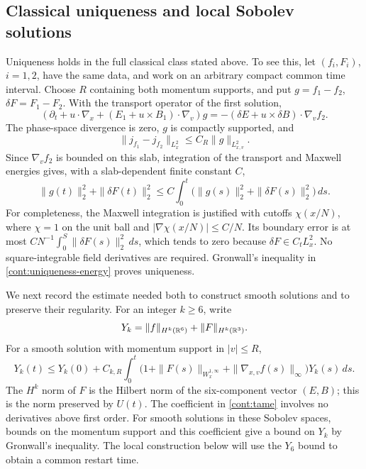 \subsection{Classical uniqueness and local Sobolev solutions}
\label{cont:local}

Uniqueness holds in the full classical class stated above.  To see this,
let $(f_i,F_i)$, $i=1,2$, have the same data, and work on an arbitrary
compact common time interval.  Choose $R$ containing both momentum
supports, and put $g=f_1-f_2$, $\delta F=F_1-F_2$.
With the transport operator of the first solution,
\[
 (\partial_t+u\cdot\nabla_x+(E_1+u\times B_1)\cdot\nabla_v)g
 =-(\delta E+u\times\delta B)\cdot\nabla_v f_2.
\]
The phase-space divergence is zero, $g$ is compactly supported, and
\[
 \|j_{f_1}-j_{f_2}\|_{L^2_x}\le C_R\|g\|_{L^2_{x,v}}.
\]
Since $\nabla_v f_2$ is bounded on this slab, integration of the transport
and Maxwell energies gives, with a slab-dependent finite constant $C$,
\begin{equation}\label{cont:uniqueness-energy}
 \|g(t)\|_2^2+\|\delta F(t)\|_2^2
 \le C\int_0^t\bigl(\|g(s)\|_2^2+\|\delta F(s)\|_2^2\bigr)\,ds.
\end{equation}
For completeness, the Maxwell integration is justified with cutoffs
$\chi(x/N)$, where $\chi=1$ on the unit ball and
$|\nabla\chi(x/N)|\le C/N$.  Its boundary error is at most
$C N^{-1}\int_0^S\|\delta F(s)\|_2^2\,ds$, which tends to zero because
$\delta F\in C_tL^2_x$.  No square-integrable field derivatives are
required.  Gronwall's inequality in \eqref{cont:uniqueness-energy}
proves uniqueness.

We next record the estimate needed both to construct smooth solutions
and to preserve their regularity.  For an integer $k\ge6$, write
\[
 Y_k=\|f\|_{H^k(\mathbb R^6)}+\|F\|_{H^k(\mathbb R^3)}.
\]
For a smooth solution with momentum support in $|v|\le R$,
\begin{equation}\label{cont:tame}
 Y_k(t)\le Y_k(0)+C_{k,R}\int_0^t
 \bigl(1+\|F(s)\|_{W^{1,\infty}_x}
          +\|\nabla_{x,v}f(s)\|_\infty\bigr)Y_k(s)\,ds.
\end{equation}
The $H^k$ norm of $F$ is the Hilbert norm of the six-component vector
$(E,B)$; this is the norm preserved by $U(t)$.
The coefficient in \eqref{cont:tame} involves no derivatives above
first order.  For smooth solutions in these Sobolev spaces, bounds on
the momentum support and this coefficient give a bound on $Y_k$ by
Gronwall's inequality.  The local construction below will use the
$Y_6$ bound to obtain a common restart time.

